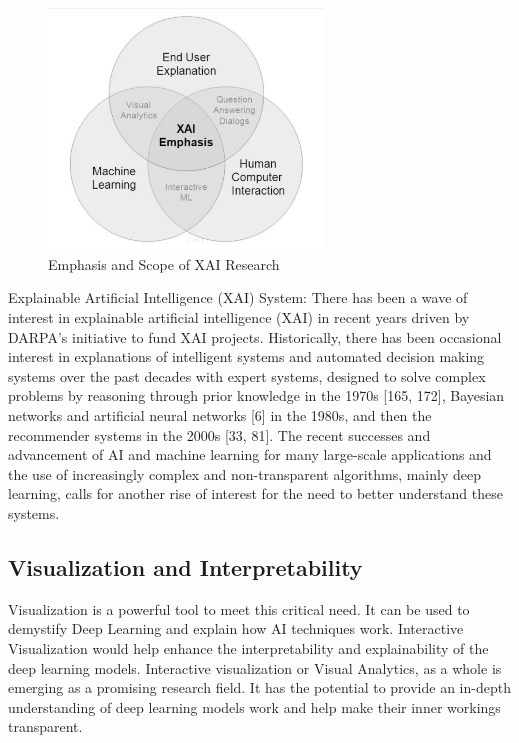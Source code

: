 \begin{figure}[htbp]
\centering
\includegraphics[width=0.65\textwidth]{images/XAI Research-1-crop.png}
\caption{Emphasis and Scope of XAI Research}
\label{fig:xai-1}
\end{figure}

Explainable Artificial Intelligence (XAI) System:  There has been a wave of interest in explainable artificial intelligence (XAI) in recent years driven by DARPA’s initiative to fund XAI projects. Historically, there has been occasional interest in explanations of intelligent systems and automated decision making systems over the past decades with expert systems, designed to solve complex problems by reasoning through prior knowledge in the 1970s [165, 172], Bayesian networks and artificial neural networks [6] in the 1980s, and then the recommender systems in the 2000s [33, 81]. The recent successes and advancement of AI and machine learning for many large-scale applications and the use of increasingly complex and non-transparent algorithms, mainly deep learning, calls for another rise of interest for the need to better understand these systems.

\subsection{Visualization and Interpretability}

Visualization is a powerful tool to meet this critical need. It can be used to demystify Deep Learning and explain how AI techniques work. Interactive Visualization would help enhance the interpretability and explainability of the deep learning models. Interactive visualization or Visual Analytics, as a whole is emerging as a promising research field. It has the potential to provide an in-depth understanding of deep learning models work and help make their inner workings transparent.

